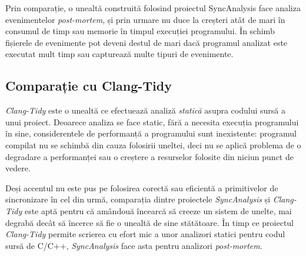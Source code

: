 Prin comparație, o unealtă construită folosind proiectul SyncAnalysis
face analiza evenimentelor \textit{post-mortem}, și prin urmare nu duce
la creșteri atât de mari în consumul de timp sau memorie în timpul
execuției programului. În schimb fișierele de evenimente pot deveni
destul de mari dacă programul analizat este executat mult timp sau
capturează multe tipuri de evenimente.

\subsection{Comparație cu Clang-Tidy}
\textit{Clang-Tidy}\cite{ClangTidy} este o unealtă ce efectuează analiză
\textit{statică} asupra codului sursă a unui proiect. Deoarece analiza
se face static, fără a necesita execuția programului în sine,
considerentele de performanță a programului sunt inexistente: programul
compilat nu se schimbă din cauza folosirii uneltei, deci nu se aplică
problema de o degradare a performanței sau o creștere a resurselor
folosite din niciun punct de vedere.

Deși accentul nu este pus pe folosirea corectă sau eficientă a
primitivelor de sincronizare în cel din urmă, comparația dintre
proiectele \textit{SyncAnalysis} și \textit{Clang-Tidy} este aptă pentru
că amândouă încearcă să creeze un sistem de unelte, mai degrabă decât
să încerce să fie o unealtă de sine stătătoare. În timp ce proiectul
\textit{Clang-Tidy} permite scrierea cu efort mic a unor analizori
statici pentru codul sursă de C/C++, \textit{SyncAnalysis} face asta
pentru analizori \textit{post-mortem}.
